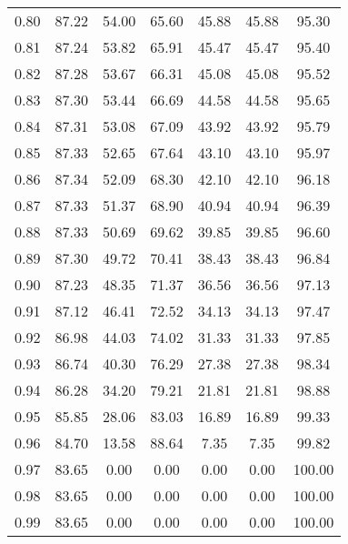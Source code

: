 \begin{tabular}{|c|c|c|c|c|c|c|}
      0.80 &     87.22 &     54.00 &      65.60 &   45.88 &      45.88 &         95.30 \\
      0.81 &     87.24 &     53.82 &      65.91 &   45.47 &      45.47 &         95.40 \\
      0.82 &     87.28 &     53.67 &      66.31 &   45.08 &      45.08 &         95.52 \\
      0.83 &     87.30 &     53.44 &      66.69 &   44.58 &      44.58 &         95.65 \\
      0.84 &     87.31 &     53.08 &      67.09 &   43.92 &      43.92 &         95.79 \\
      0.85 &     87.33 &     52.65 &      67.64 &   43.10 &      43.10 &         95.97 \\
      0.86 &     87.34 &     52.09 &      68.30 &   42.10 &      42.10 &         96.18 \\
      0.87 &     87.33 &     51.37 &      68.90 &   40.94 &      40.94 &         96.39 \\
      0.88 &     87.33 &     50.69 &      69.62 &   39.85 &      39.85 &         96.60 \\
      0.89 &     87.30 &     49.72 &      70.41 &   38.43 &      38.43 &         96.84 \\
      0.90 &     87.23 &     48.35 &      71.37 &   36.56 &      36.56 &         97.13 \\
      0.91 &     87.12 &     46.41 &      72.52 &   34.13 &      34.13 &         97.47 \\
      0.92 &     86.98 &     44.03 &      74.02 &   31.33 &      31.33 &         97.85 \\
      0.93 &     86.74 &     40.30 &      76.29 &   27.38 &      27.38 &         98.34 \\
      0.94 &     86.28 &     34.20 &      79.21 &   21.81 &      21.81 &         98.88 \\
      0.95 &     85.85 &     28.06 &      83.03 &   16.89 &      16.89 &         99.33 \\
      0.96 &     84.70 &     13.58 &      88.64 &    7.35 &       7.35 &         99.82 \\
      0.97 &     83.65 &      0.00 &       0.00 &    0.00 &       0.00 &        100.00 \\
      0.98 &     83.65 &      0.00 &       0.00 &    0.00 &       0.00 &        100.00 \\
      0.99 &     83.65 &      0.00 &       0.00 &    0.00 &       0.00 &        100.00 \\
\bottomrule
\end{tabular}
